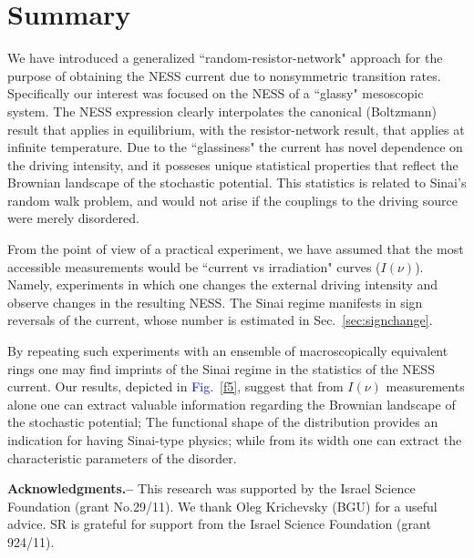 \documentclass[aps,pre,floats,floatfix,twocolumn]{revtex4}
\newcommand{\Fig}[1]{\textcolor{blue}{Fig.}\!\!~\ref{#1}}
\newcommand{\rmrk}[1]{{#1}}    %
\begin{document}
\section{Summary}
\label{sec:summary}

We have introduced a generalized ``random-resistor-network"
approach for the purpose of obtaining the NESS current
due to nonsymmetric transition rates. Specifically our 
interest was focused on the NESS of a ``glassy" mesoscopic system. 
The NESS expression clearly interpolates the canonical (Boltzmann) result 
that applies in equilibrium, with the resistor-network result, 
that applies at infinite temperature. 
Due to the ``glassiness" the current has novel dependence 
on the driving intensity, and it posseses unique statistical properties 
that reflect the Brownian landscape of the stochastic potential.
This statistics is related to Sinai's random walk problem, 
and would not arise if the couplings to the driving source 
were merely disordered.

\rmrk{From the point of view of a practical experiment, 
we have assumed that the most accessible measurements 
would be ``current vs irradiation" curves ($I(\nu)$). 
Namely, experiments in which one changes the external driving 
intensity and observe changes in the resulting NESS. 
The Sinai regime manifests in sign reversals
of the current, whose number is estimated in Sec.~\ref{sec:signchange}.}

\rmrk{By repeating such experiments with an ensemble
of macroscopically equivalent rings one may find imprints 
of the Sinai regime in the statistics of the NESS current.
Our results, depicted in \Fig{f5}, suggest that from $I(\nu)$ measurements alone 
one can extract valuable information regarding 
the Brownian landscape of the stochastic potential;
The functional shape of the distribution provides 
an indication for having Sinai-type physics; 
while from its width one can extract the characteristic 
parameters of the disorder.}       



{\bf Acknowledgments.-- }
This research was supported by the Israel Science Foundation (grant No.29/11).
We thank Oleg Krichevsky (BGU) for a useful advice. SR is grateful for support from
the Israel Science Foundation (grant 924/11).
\end{document}
